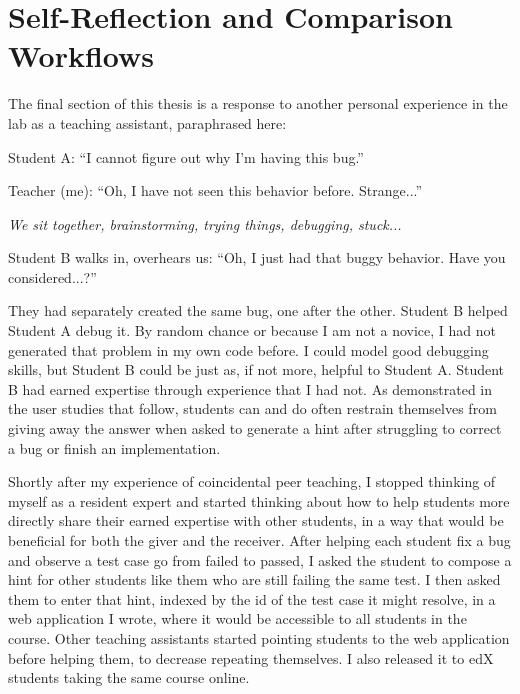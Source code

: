 \section{Self-Reflection and Comparison Workflows}


The final section of this thesis is a response to another personal experience in the lab as a teaching assistant, paraphrased here:
\begin{displayquote}
    Student A: ``I cannot figure out why I'm having this bug.''

    Teacher (me): ``Oh, I have not seen this behavior before. Strange...''

    {\it We sit together, brainstorming, trying things, debugging, stuck...}

    Student B walks in, overhears us: ``Oh, I just had that buggy behavior. Have you considered...?''
\end{displayquote}
They had separately created the same bug, one after the other. Student B helped Student A debug it. By random chance or because I am not a novice, I had not generated that problem in my own code before. I could model good debugging skills, but Student B could be just as, if not more, helpful to Student A. Student B had earned expertise through experience that I had not. As demonstrated in the user studies that follow, students can and do often restrain themselves from giving away the answer when asked to generate a hint after struggling to correct a bug or finish an implementation. 

Shortly after my experience of coincidental peer teaching, I stopped thinking of myself as a resident expert and started thinking about how to help students more directly share their earned expertise with other students, in a way that would be beneficial for both the giver and the receiver. After helping each student fix a bug and observe a test case go from failed to passed, I asked the student to compose a hint for other students like them who are still failing the same test. I then asked them to enter that hint, indexed by the id of the test case it might resolve, in a web application I wrote, where it would be accessible to all students in the course. Other teaching assistants started pointing students to the web application before helping them, to decrease repeating themselves. I also released it to edX students taking the same course online. 

